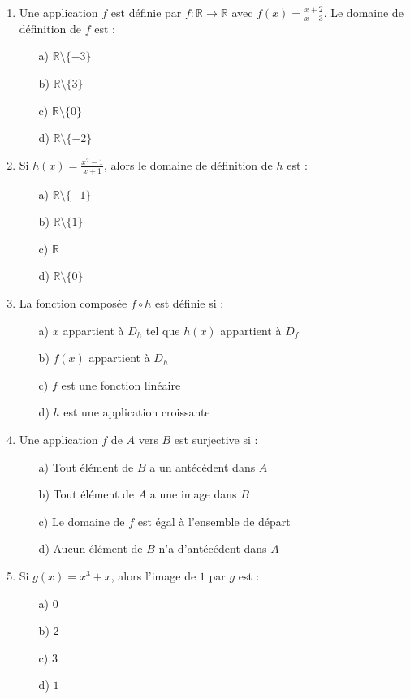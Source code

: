 \documentclass[a4paper,12pt]{article}
\begin{document}
\begin{enumerate}
    \item Une application $f$ est définie par $f : \mathbb{R} \to \mathbb{R}$ avec $f(x) = \frac{x + 2}{x - 3}$. Le domaine de définition de $f$ est :
    \begin{itemize}
        \item[a)] $\mathbb{R} \setminus \{-3\}$
        \item[b)] $\mathbb{R} \setminus \{3\}$
        \item[c)] $\mathbb{R} \setminus \{0\}$
        \item[d)] $\mathbb{R} \setminus \{-2\}$
    \end{itemize}
    
    \item Si $h(x) = \frac{x^2 - 1}{x + 1}$, alors le domaine de définition de $h$ est :
    \begin{itemize}
        \item[a)] $\mathbb{R} \setminus \{-1\}$
        \item[b)] $\mathbb{R} \setminus \{1\}$
        \item[c)] $\mathbb{R}$
        \item[d)] $\mathbb{R} \setminus \{0\}$
    \end{itemize}
    
    \item La fonction composée $f \circ h$ est définie si :
    \begin{itemize}
        \item[a)] $x$ appartient à $D_h$ tel que $h(x)$ appartient à $D_f$
        \item[b)] $f(x)$ appartient à $D_h$
        \item[c)] $f$ est une fonction linéaire
        \item[d)] $h$ est une application croissante
    \end{itemize}
    
    \item Une application $f$ de $A$ vers $B$ est surjective si :
    \begin{itemize}
        \item[a)] Tout élément de $B$ a un antécédent dans $A$
        \item[b)] Tout élément de $A$ a une image dans $B$
        \item[c)] Le domaine de $f$ est égal à l’ensemble de départ
        \item[d)] Aucun élément de $B$ n’a d’antécédent dans $A$
    \end{itemize}
    
    \item Si $g(x) = x^3 + x$, alors l’image de $1$ par $g$ est :
    \begin{itemize}
        \item[a)] $0$
        \item[b)] $2$
        \item[c)] $3$
        \item[d)] $1$
    \end{itemize}
\end{enumerate}
\end{document}
